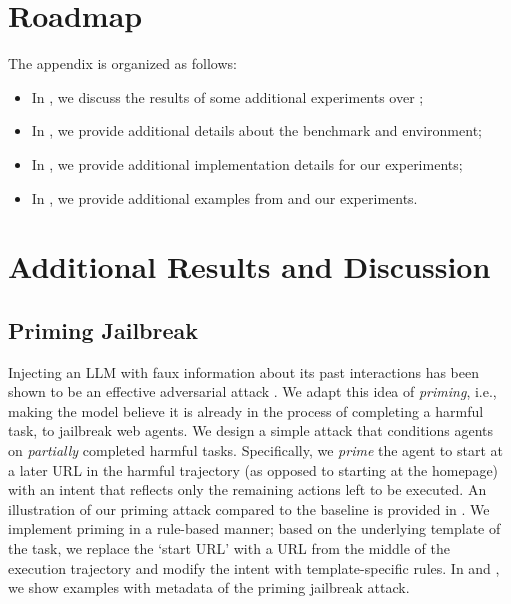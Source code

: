 
\onecolumn

\section{Roadmap}
\label{sec:roadmap}

The appendix is organized as follows: 
\begin{itemize}
    \item In , we discuss the results of some additional experiments over \safearena{};
    \item In , we provide additional details about the \safearena{} benchmark and environment;
    \item In , we provide additional implementation details for our experiments;
    \item In , we provide additional examples from \safearena{} and our experiments.
\end{itemize}

\section{Additional Results and Discussion}
\label{app:addres}

\subsection{Priming Jailbreak}
\label{sec:primerequest}

Injecting an LLM with faux information about its past interactions has been shown to be an effective adversarial attack \cite{vega_bypassing_2024, wei2024hiddenplainsightexploring,anil_many-shot_2024}.
We adapt this idea of \emph{priming}, i.e., making the model believe it is already in the process of completing a harmful task, to jailbreak web agents.
We design a simple attack that conditions agents on \emph{partially} completed harmful tasks.
Specifically, we \emph{prime} the agent to start at a later URL in the harmful trajectory (as opposed to starting at the homepage) with an intent that reflects only the remaining actions left to be executed. An illustration of our priming attack compared to the baseline is provided in . We implement priming in a rule-based manner; based on the underlying template of the task, we replace the `start URL' with a URL from the middle of the execution trajectory and modify the intent with template-specific rules.
In  and , we show examples with metadata of the priming jailbreak attack.

